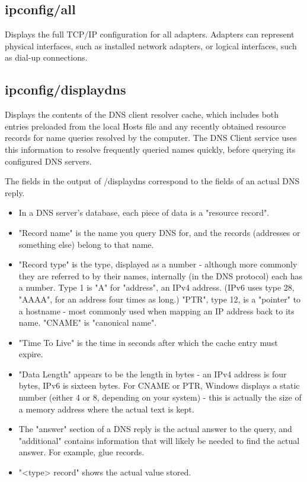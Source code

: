 \documentclass[a4paper,12pt]{book}
\begin{document}
\subsection{ipconfig/all}
Displays the full TCP/IP configuration for all adapters. Adapters can represent physical interfaces, such as installed network adapters, or logical interfaces, such as dial-up connections.

\subsection{ipconfig/displaydns}
Displays the contents of the DNS client resolver cache, which includes both entries preloaded from the local Hosts file and any recently obtained resource records for name queries resolved by the computer. The DNS Client service uses this information to resolve frequently queried names quickly, before querying its configured DNS servers.

The fields in the output of /displaydns correspond to the fields of an actual DNS reply.

\begin{itemize}
\item{In a DNS server's database, each piece of data is a "resource record".}
\item{"Record name" is the name you query DNS for, and the records (addresses or something else) belong to that name.}
\item{"Record type" is the type, displayed as a number - although more commonly they are referred to by their names, internally (in the DNS protocol) each has a number. Type 1 is "A" for "address", an IPv4 address. (IPv6 uses type 28, "AAAA", for an address four times as long.) "PTR", type 12, is a "pointer" to a hostname - most commonly used when mapping an IP address back to its name. "CNAME" is "canonical name".}
\item{"Time To Live" is the time in seconds after which the cache entry must expire.}
\item{"Data Length" appears to be the length in bytes - an IPv4 address is four bytes, IPv6 is sixteen bytes. For CNAME or PTR, Windows displays a static number (either 4 or 8, depending on your system) - this is actually the size of a memory address where the actual text is kept.}
\item{The "answer" section of a DNS reply is the actual answer to the query, and "additional" contains information that will likely be needed to find the actual answer. For example, glue records.}
\item{"<type> record" shows the actual value stored.}
\end{itemize}
\end{document}
